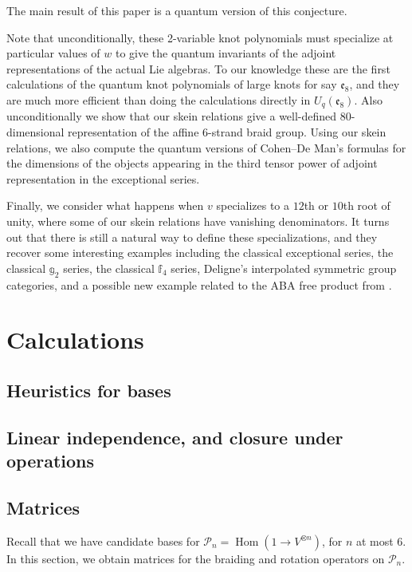 \documentclass[12pt]{amsart}
\begin{document}
The main result of this paper is a quantum version of this conjecture.



 

Note that unconditionally, these 2-variable knot polynomials must specialize at particular values of $w$ to give the quantum invariants of the adjoint representations of the actual Lie algebras.  To our knowledge these are the first calculations of the quantum knot polynomials of large knots for say $\mathfrak{e}_8$, and they are much more efficient than doing the calculations directly in $U_q(\mathfrak{e}_8)$.  Also unconditionally we show that our skein relations give a well-defined $80$-dimensional representation of the affine $6$-strand braid group.  Using our skein relations, we also compute the quantum versions of Cohen--De Man's formulas for the dimensions of the objects appearing in the third tensor power of adjoint representation in the exceptional series.

Finally, we consider what happens when $v$ specializes to a $12$th or $10$th root of unity, where some of our skein relations have vanishing denominators.  It turns out that there is still a natural way to define these specializations, and they recover some interesting examples including the classical exceptional series, the classical $\mathbb{g}_2$ series, the classical $\mathbb{f}_4$ series, Deligne's interpolated symmetric group categories, and a possible new example related to the ABA free product from \cite{???}.


\section{Calculations}
\label{sec:calculations}
\newcommand{\V}{\mathcal{P}}

\subsection{Heuristics for bases}

\subsection{Linear independence, and closure under operations}

\subsection{Matrices}
Recall that we have candidate bases for 
$\V_n = \operatorname{Hom}(1 \to V^{\otimes n})$, for $n$ at most 6.
In this section, we obtain matrices for the braiding and rotation operators on
 $\V_n$.
\end{document}
